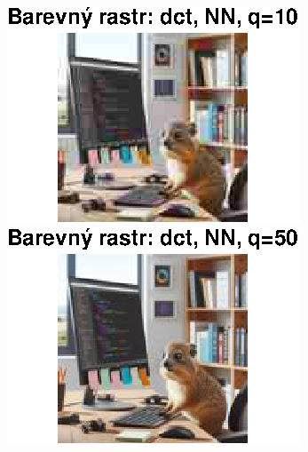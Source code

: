 \begin{figure}[H]
    \centering
    \begin{minipage}[b]{0.3\textwidth}
        \centering
        \includegraphics[width=\textwidth]{images/barevny_dct_NN_q10.eps}
    \end{minipage}
    \hfill
    \begin{minipage}[b]{0.3\textwidth}
        \centering
        \includegraphics[width=\textwidth]{images/barevny_dct_NN_q50.eps}
    \end{minipage}
    \hfill
    \begin{minipage}[b]{0.3\textwidth}
        \centering

\end{minipage}
\end{figure}

